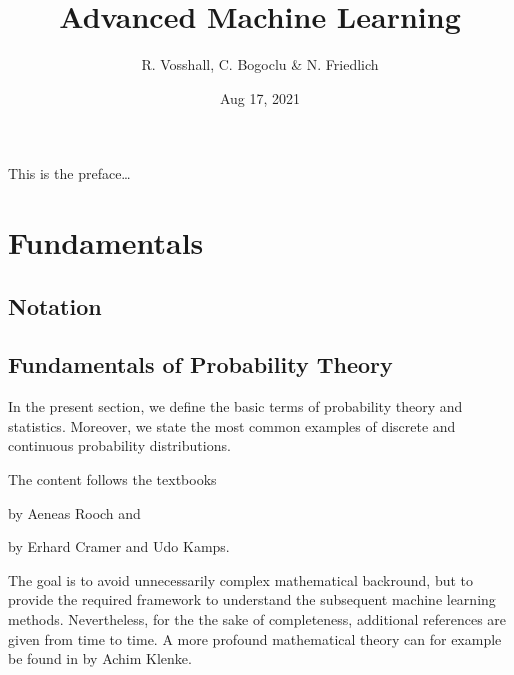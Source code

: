 \documentclass[letterpaper,10pt,english]{jupyterBook}
\title{Advanced Machine Learning}
\date{Aug 17, 2021}
\author{R.\@{} Vosshall, C.\@{} Bogoclu \& N.\@{} Friedlich}
\begin{document}
\pagestyle{empty}
\sphinxmaketitle
\pagestyle{plain}
\sphinxtableofcontents
\pagestyle{normal}
\label{\detokenize{preface::doc}}


\sphinxAtStartPar
This is the preface…


\part{Fundamentals}


\chapter{Notation}
\label{\detokenize{fund/notation:notation}}\label{\detokenize{fund/notation::doc}}

\chapter{Fundamentals of Probability Theory}
\label{\detokenize{fund/fundprob:fundamentals-of-probability-theory}}\label{\detokenize{fund/fundprob::doc}}
\sphinxAtStartPar
In the present section, we define the basic terms of probability theory and statistics. Moreover, we state the most common examples of discrete and continuous probability distributions.

\sphinxAtStartPar
The content follows the textbooks

\sphinxAtStartPar
{}

\sphinxAtStartPar
by Aeneas Rooch and

\sphinxAtStartPar
{}

\sphinxAtStartPar
by Erhard Cramer and Udo Kamps.

\sphinxAtStartPar
The goal is to avoid unnecessarily complex mathematical backround, but to provide the required framework to understand the subsequent machine learning methods. Nevertheless, for the the sake of completeness, additional references are given from time to time. A more profound mathematical theory can for example be found in  by Achim Klenke.
\end{document}
